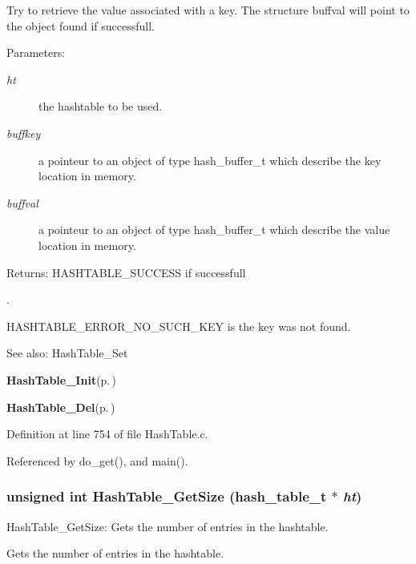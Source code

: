 Try to retrieve the value associated with a key. The structure buffval will point to the object found if successfull.

\begin{Desc}
\item[Parameters:]
\begin{description}
\item[{\em ht}]the hashtable to be used. \item[{\em buffkey}]a pointeur to an object of type hash\_\-buffer\_\-t which describe the key location in memory. \item[{\em buffval}]a pointeur to an object of type hash\_\-buffer\_\-t which describe the value location in memory.\end{description}
\end{Desc}
\begin{Desc}
\item[Returns:]HASHTABLE\_\-SUCCESS if successfull\par
. 

HASHTABLE\_\-ERROR\_\-NO\_\-SUCH\_\-KEY is the key was not found.\end{Desc}
\begin{Desc}
\item[See also:]Hash\-Table\_\-Set 

{\bf Hash\-Table\_\-Init}{\rm (p.\,\pageref{group__HashTableExportedFunctions_ga0})} 

{\bf Hash\-Table\_\-Del}{\rm (p.\,\pageref{group__HashTableExportedFunctions_ga3})} \end{Desc}


Definition at line 754 of file Hash\-Table.c.

Referenced by do\_\-get(), and main().
\subsubsection{\setlength{\rightskip}{0pt plus 5cm}unsigned int Hash\-Table\_\-Get\-Size (hash\_\-table\_\-t $\ast$ {\em ht})}\label{group__HashTableExportedFunctions_ga5}


Hash\-Table\_\-Get\-Size: Gets the number of entries in the hashtable.

Gets the number of entries in the hashtable.

